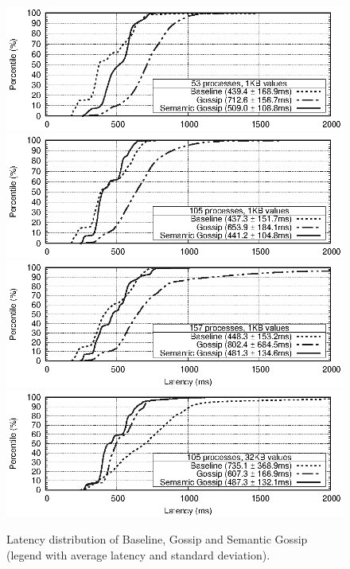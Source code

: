 \begin{figure}[htbp]
\centering
\includegraphics[width=\columnwidth]{figures/cdf-n53-size1kb.eps}
\includegraphics[width=\columnwidth]{figures/cdf-n105-size1kb.eps}
\includegraphics[width=\columnwidth]{figures/cdf-n157-size1kb.eps}
\includegraphics[width=\columnwidth]{figures/cdf-n105-size32kb.eps}
%
\caption{Latency distribution of Baseline, Gossip and Semantic Gossip (legend with average latency and standard deviation).}
\label{fig:cdfs}
\end{figure}

